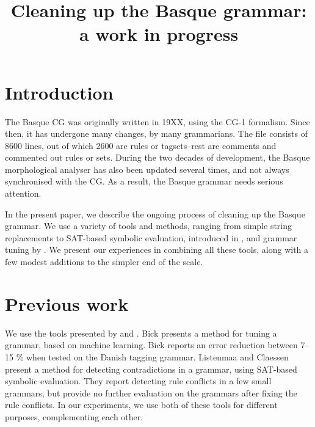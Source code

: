 \documentclass[11pt]{article}
\title{Cleaning up the Basque grammar: a work in progress}
\date{}
\begin{document}
\maketitle



\section{Introduction}

The Basque CG was originally written in 19XX, using the CG-1 formalism. Since then, it has undergone many changes, by many grammarians. The file consists of 8600 lines, out of which 2600 are rules or tagsets--rest are comments and commented out rules or sets. During the two decades of development, the Basque morphological analyser has also been updated several times, and not always synchronised with the CG. As a result, the Basque grammar needs serious attention.

In the present paper, we describe the ongoing process of cleaning up the Basque grammar. We use a variety of tools and methods, ranging from simple string replacements to SAT-based symbolic evaluation, introduced in \cite{listenmaa_claessen2016}, and grammar tuning by \cite{bick2013tuning}. We present our experiences in combining all these tools, along with a few modest additions to the simpler end of the scale.


\section{Previous work}
We use the tools presented by \cite{bick2013tuning} and \cite{listenmaa_claessen2016}.
Bick \cite{bick2013tuning} presents a method for tuning a grammar, based on machine learning. Bick reports an error reduction between 7--15 \% when tested on the Danish tagging grammar.
Listenmaa and Claessen \cite{listenmaa_claessen2016} present a method for detecting contradictions in a grammar, using SAT-based symbolic evaluation.  They report detecting rule conflicts in a few small grammars, but provide no further evaluation on the grammars after fixing the rule conflicts. 
In our experiments, we use both of these tools for different purposes, complementing each other.
\end{document}
